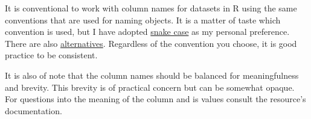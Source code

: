 \documentclass[
  letterpaper,
]{latex/krantz}
\begin{document}
\begin{tcolorbox}[enhanced jigsaw, opacitybacktitle=0.6, breakable, colframe=quarto-callout-warning-color-frame, arc=.35mm, left=2mm, leftrule=.75mm, title=\textcolor{quarto-callout-warning-color}{\faExclamationTriangle}\hspace{0.5em}{Tip}, opacityback=0, colback=white, toptitle=1mm, rightrule=.15mm, titlerule=0mm, bottomtitle=1mm, bottomrule=.15mm, coltitle=black, colbacktitle=quarto-callout-warning-color!10!white, toprule=.15mm]
It is conventional to work with column names for datasets in R using the
same conventions that are used for naming objects. It is a matter of
taste which convention is used, but I have adopted
\href{https://bookdown.org/content/d1e53ac9-28ce-472f-bc2c-f499f18264a3/names.html\#snake_case}{snake
case} as my personal preference. There are also
\href{https://bookdown.org/content/d1e53ac9-28ce-472f-bc2c-f499f18264a3/names.html}{alternatives}.
Regardless of the convention you choose, it is good practice to be
consistent.

It is also of note that the column names should be balanced for
meaningfulness and brevity. This brevity is of practical concern but can
be somewhat opaque. For questions into the meaning of the column and is
values consult the resource's documentation.
\end{tcolorbox}
\end{document}
